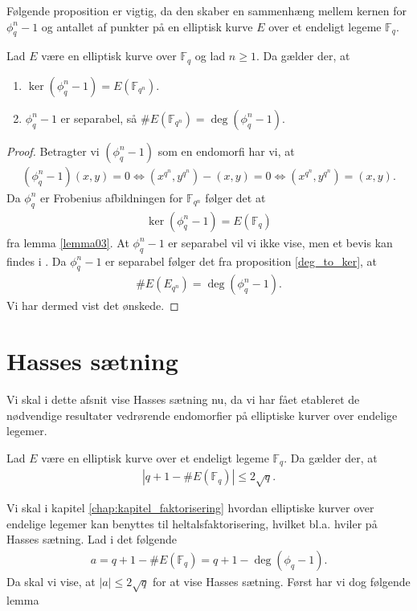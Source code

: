 Følgende proposition er vigtig, da den skaber en sammenhæng mellem kernen for $\phi_{q}^{n} - 1$ og antallet af punkter på en elliptisk kurve $E$ over et endeligt legeme $\mathbb{F}_{q}$.

\begin{proposition}
\label{prop_imp}
Lad $E$ være en elliptisk kurve over $\mathbb{F}_q$ og lad $n \geq 1$. Da gælder der,
at 
\begin{enumerate}
	\item $\ker (\phi_{q}^n - 1) = E(\mathbb{F}_{q^n})$. \label{test}
	\item $\phi_{q}^{n}-1$ er separabel, så $\#E(\mathbb{F}_{q^n})=\deg (\phi_{q}^{n}-1)$. 
\end{enumerate}
\end{proposition}
\begin{proof}
Betragter vi $(\phi_{q}^{n} - 1)$ som en endomorfi har vi, at
\begin{align*}
	(\phi_{q}^{n} - 1)(x, y) = 0 \Leftrightarrow (x^{q^n}, y^{q^n}) - (x, y) = 0 
	\Leftrightarrow (x^{q^n}, y^{q^n}) = (x, y).
\end{align*}
Da $\phi_{q}^{n}$ er Frobenius afbildningen for $\mathbb{F}_{q^n}$ følger det at 
\begin{align*}
	\ker (\phi_{q}^{n} - 1) = E(\mathbb{F}_q)
\end{align*} 
fra lemma \ref{lemma03}. At $\phi_{q}^{n} -1$ er separabel vil vi ikke vise, men et bevis kan findes
i \cite[s.~58]{Washington}. Da $\phi_{q}^{n} - 1$ er separabel følger det fra proposition \ref{deg_to_ker}, at
\begin{align*}
	\#E(E_{q^n})=\deg(\phi_{q}^{n} -1).
\end{align*} 
Vi har dermed vist det ønskede.
\end{proof}

\section{Hasses sætning}
Vi skal i dette afsnit vise Hasses sætning nu, da vi har fået etableret de nødvendige resultater vedrørende endomorfier på elliptiske kurver over endelige legemer.
\begin{thm}[Hasse]
\label{hasse}
Lad $E$ være en elliptisk kurve over et endeligt legeme $\mathbb{F}_q$. Da gælder der, at 
\begin{align*}
	|q + 1 - \#E(\mathbb{F}_q)| \leq 2 \sqrt{q}.
\end{align*}
\end{thm}
Vi skal i kapitel \ref{chap:kapitel_faktorisering} hvordan elliptiske kurver over endelige legemer kan benyttes til heltalsfaktorisering, hvilket bl.a. hviler på Hasses sætning.
Lad i det følgende 
\begin{align}
	\label{hasse_as}
	a = q + 1 - \#E(\mathbb{F}_q) = q + 1 - \deg(\phi_q - 1).
\end{align}
Da skal vi vise, at $|a| \leq 2 \sqrt{q}$ for at vise Hasses sætning. Først har vi dog følgende lemma

